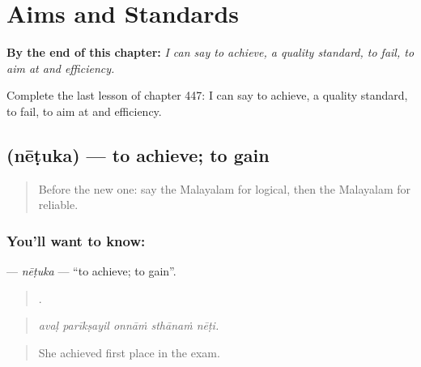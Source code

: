 
\chapter{Aims and Standards}
\label{ch:ml-aims-and-standards}

\begin{chapteropening}
\textbf{By the end of this chapter:} \emph{I can say to achieve, a quality standard, to fail, to aim at and efficiency.}

Complete the last lesson of chapter 447: I can say to achieve, a quality standard, to fail, to aim at and efficiency.
\end{chapteropening}

\section[\texorpdfstring{\ml{നേടുക} (nēṭuka)}{നേടുക (nēṭuka)}]{ (nēṭuka) — to achieve; to gain}

\label{lesson:ML-C447-netuka}



\begin{quote}
Before the new one: say the Malayalam for logical, then the Malayalam for reliable.
\end{quote}

\subsection*{You'll want to know: }
\textbf{} — \emph{nēṭuka} — \textquotedblleft{}to achieve; to gain\textquotedblright{}.

\begin{quote}
    .
\end{quote}

\begin{quote}
\emph{avaḷ parīkṣayil onnāṁ sthānaṁ nēṭi.}
\end{quote}

\begin{quote}
She achieved first place in the exam.
\end{quote}

